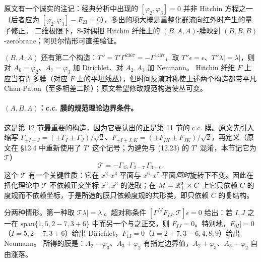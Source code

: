 原文有一个诚实的注记：经典分析中出现的 \([\varphi_2,\varphi_3]=0\) 并非 Hitchin 方程之一（后者应为 \([\varphi_2,\varphi_3]-F_{23}=0\)），多出的项大概是重整化群流向红外时产生的量子修正。\pA{} 二维极限下，S-对偶把 Hitchin 纤维上的 \((B,A,A)\)-膜映到 \((B,B,B)\)-zerobrane；阿贝尔情形可直接验证。\pA{}

\((B,A,A)\) 还有第二个构造：\(T''=T'\Gamma^{2367}=-\Gamma^{1467}\)，取 \(T''\epsilon=\epsilon\)、\(T''\lambda|=\lambda|\)，则对 \(A_6=\varphi_2\)、\(A_7=\varphi_3\) 加 Dirichlet、对 \(A_2,A_3\) 加 Neumann。\pA{} Hitchin 纤维 \(F\) 上应当有许多膜（对应 \(F\) 上的平坦线丛），但时间反演对称使上述两个构造都带平凡 Chan-Paton（至多相差二阶）；原文希望修改规范构造使丛可变。\pA{}

\paragraph{\((A,B,A)\)：c.c. 膜的规范理论边界条件。}这是第 12 节最重要的构造，因为它要认出的正是第 11 节的 c.c. 膜。原文先引入缩写 \(\Gamma_{\pm I\pm J}=(\pm\Gamma_I\pm\Gamma_J)/\sqrt2\)、\(F_{\pm I\pm J,K}=(\pm F_{IK}\pm F_{JK})/\sqrt2\)，再定义（原文在 \S12.4 中重新使用了 \(T'\) 这个记号；为避免与 (12.23) 的 \(T'\) 混淆，本节记它为 \(\mathcal T\)）
\begin{equation}
\mathcal T=-\Gamma_{15}\,\Gamma_{2-7}\,\Gamma_{3+6}.
\label{eq:T-ABA}
\end{equation}
\pA{} 这个 \(\mathcal T\) 有一个关键性质：它在 \(x^2\)-\(x^3\) 平面与 \(x^6\)-\(x^7\) 平面\emph{同时}旋转下不变。因此在扭化理论中 \(\mathcal T\) 不依赖正交坐标 \(x^2,x^3\) 的选取；在 \(M=\mathbb{R}^2_+\times C\) 上它只依赖 \(C\) 的度规而不依赖坐标，于是所造的膜只依赖度规的共形类，即只依赖 \(C\) 的复结构。\pA{}

分两种情形。第一种取 \(\mathcal T\lambda|=\lambda|\)。超对称条件 \([\Gamma^{IJ}F_{IJ},\mathcal T]\epsilon=0\) 给出：若 \(I,J\) 之一在 \(\mathrm{span}\{1,5,2-7,3+6\}\) 中而另一个与之正交，则 \(F_{IJ}=0\)。特别地，\(F_{0I}|=0\)（\(I=5,2-7,3+6\)）给出 Dirichlet，\(F_{1I}=0\)（\(I=2+7,3-6,4,8,9\)）给出 Neumann。\pA{} 所得的膜是：\(A_2-\varphi_3\)、\(A_3+\varphi_2\) 有指定边界值，\(A_2+\varphi_3\)、\(A_3-\varphi_2\) 自由涨落。\pA{}

